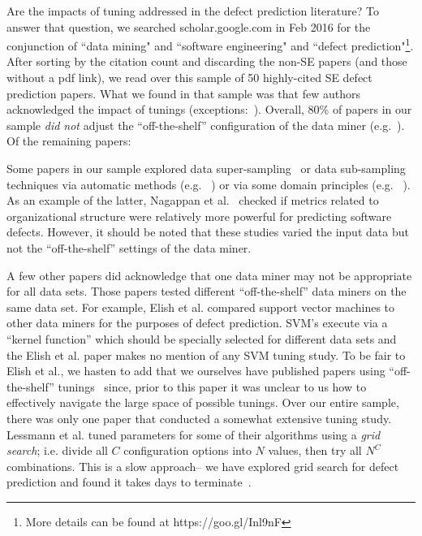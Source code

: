 Are the impacts of tuning addressed in the defect prediction literature?
To answer that question,  we searched scholar.google.com in Feb 2016  for the conjunction of ``data mining" and ``software engineering" and  ``defect prediction"\footnote{More details can be found at https://goo.gl/Inl9nF}.
After sorting by the citation count and discarding the non-SE papers (and those without a pdf link), we read over this sample
of  50 highly-cited SE defect prediction papers. 
What we found in that sample was that few authors
acknowledged the impact of tunings (exceptions:~\cite{Gao:2011,lessmann2008benchmarking}).
Overall,  80\% of papers in our sample {\em did not} adjust
the ``off-the-shelf'' configuration of the data miner (e.g.~\cite{me07b,Moser:2008,Elish2008649}). Of the remaining papers:
\bi
\item
Some papers in our sample  explored   data super-sampling~\cite{4271036} or data sub-sampling techniques via  automatic methods (e.g. ~\cite{Gao:2011,me07b,4271036,Kim:2011}) 
or via some domain principles (e.g. ~\cite{Moser:2008,Nagappan:2008,Hassan:2009}).
As an example of the latter, Nagappan et al.~\cite{Nagappan:2008} checked if metrics related to organizational structure were relatively more powerful for predicting software defects. 
However, it should be noted that  these studies varied the input data but
not the   ``off-the-shelf''   settings of the data miner.
\item
A few other papers did acknowledge that one data miner may not be appropriate
for all data sets.  Those papers tested  different  
``off-the-shelf'' data miners on the same data set.
For example, Elish et al.\cite{Elish2008649}  compared support vector
machines to other data miners for the purposes of defect prediction. SVM's execute via a ``kernel function'' which should be specially selected for different data sets and
the Elish et al. paper  makes no mention of any SVM tuning study.  
To be fair to Elish et al., we hasten to add that we
ourselves have  published
papers using ``off-the-shelf'' tunings~\cite{me07b} since,
prior to this paper it was unclear to us how to effectively
navigate the large space of possible tunings.
\ei
Over our entire sample, there was only  one paper that conducted a somewhat extensive tuning study.
Lessmann et al.\cite{lessmann2008benchmarking} tuned parameters for some of their algorithms using  a {\em grid search}; i.e. divide all $C$ configuration
options into $N$ values, then try all   $N^C$ combinations.
This is a slow approach-- we have explored grid search for 
defect prediction and found it takes days to terminate~\cite{me07b}.
